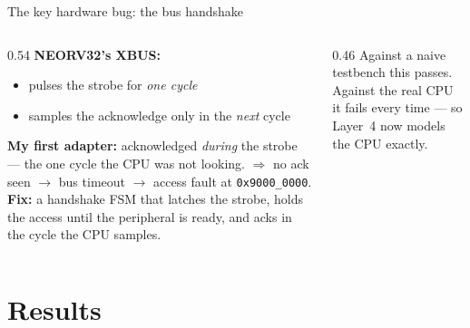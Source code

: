 \documentclass[aspectratio=169,11pt]{beamer}
\newcommand{\code}[1]{\texttt{\small #1}}
\begin{document}
\begin{frame}{The key hardware bug: the bus handshake}
\begin{columns}[T]
\begin{column}{0.54\textwidth}
\small
\textbf{NEORV32's XBUS:}
\begin{itemize}
\item pulses the strobe for \emph{one cycle}
\item samples the acknowledge only in the \emph{next} cycle
\end{itemize}
\vspace{2mm}
\textbf{My first adapter:} acknowledged \emph{during} the strobe --- the one cycle
the CPU was not looking.
\vspace{2mm}
$\Rightarrow$ no ack seen $\to$ bus timeout $\to$ \alert{access fault at
\code{0x9000\_0000}}.
\vspace{2mm}
\textbf{Fix:} a handshake FSM that latches the strobe, holds the access until the
peripheral is ready, and acks in the cycle the CPU samples.
\end{column}
\begin{column}{0.46\textwidth}
\centering
{}
\vspace{2mm}
{\scriptsize Against a naive testbench this passes. Against the real CPU it fails
every time --- so Layer~4 now models the CPU exactly.}
\end{column}
\end{columns}
\end{frame}

\section{Results}
\end{document}
